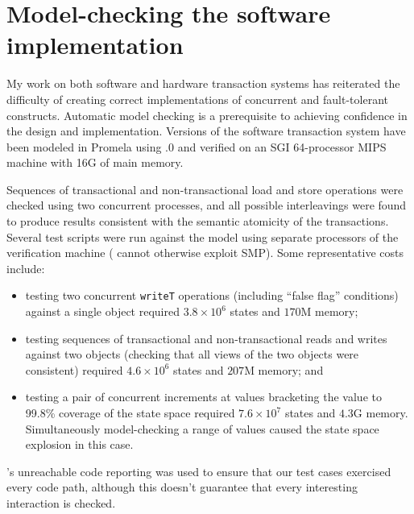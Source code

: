 \chapter{Model-checking the software implementation}\label{sec:verification}
My work on both software and hardware transaction systems has
reiterated the difficulty of creating correct implementations of
concurrent and fault-tolerant constructs.  Automatic model checking is
a prerequisite to achieving confidence in the design and implementation.
Versions of the software transaction system have been modeled in
Promela using .0 and verified on an SGI 64-processor MIPS
machine with 16G of main memory.

Sequences of transactional and non-transactional load and store
operations were checked using two concurrent processes, and all possible
interleavings were found to produce results consistent with
the semantic atomicity of the transactions.  
Several test scripts were run against the
model using separate processors of the verification machine (\Spin
cannot otherwise exploit SMP).  Some representative costs include:
\begin{itemize}
\item testing two concurrent {\tt writeT} operations (including
  ``false flag'' conditions) against a single object required $3.8\times
  10^6$ states and $170$M memory;
\item testing sequences of transactional and non-transactional reads
  and writes against two objects (checking that all views of the two
  objects were consistent) required $4.6\times 10^6$ states and $207$M
  memory; and
\item testing a pair of concurrent increments at values bracketing the
  \FLAG value to 99.8\% coverage of the state space required
  $7.6\times 10^7$ states and $4.3$G memory.  Simultaneously
  model-checking a range of values caused the state space explosion
  in this case.
\end{itemize}
\Spin's unreachable code reporting was used to ensure that our test
cases exercised every code path, although this doesn't guarantee that
every interesting interaction is checked.

